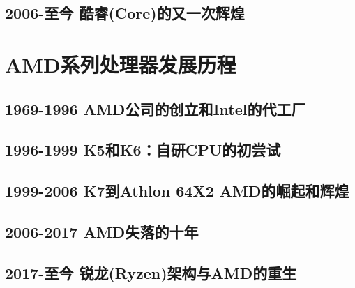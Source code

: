 \documentclass[UTF8]{ctexart}
\begin{document}
\subsection{2006-至今 酷睿(Core)的又一次辉煌}

\section{AMD系列处理器发展历程}
\subsection{1969-1996 AMD公司的创立和Intel的代工厂}
\subsection{1996-1999 K5和K6：自研CPU的初尝试}
\subsection{1999-2006 K7到Athlon 64X2 AMD的崛起和辉煌}
\subsection{2006-2017 AMD失落的十年}
\subsection{2017-至今 锐龙(Ryzen)架构与AMD的重生}
\end{document}
